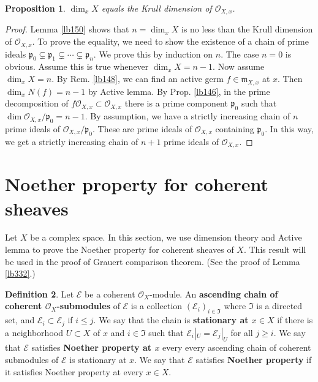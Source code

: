 \documentclass[12pt,b5paper,notitlepage]{report}
\theoremstyle{definition}
\newtheorem{df}{Definition}[section]
\theoremstyle{plain}
\newtheorem{pp}[df]{Proposition}
\newcommand{\fk}{\mathfrak}
\newcommand{\scr}{\mathscr}
\newcommand{\pk}{\mathfrak p}
\numberwithin{equation}{section}
\begin{document}
\begin{pp}\label{lb392}
$\dim_xX$ equals the Krull dimension of $\scr O_{X,x}$.  
\end{pp}


\begin{proof}
Lemma \ref{lb150} shows that $n=\dim_xX$ is no less than the Krull dimension of $\scr O_{X,x}$. To prove the equality, we need to show the existence of a chain of prime ideals $\pk_0\subsetneq\pk_1\subsetneq\cdots\subsetneq \pk_n$. We prove this by induction on $n$. The case $n=0$ is obvious. Assume this is true whenever $\dim_xX=n-1$. Now assume $\dim_xX=n$. By Rem. \ref{lb148}, we can find an active germ $f\in\fk m_{X,x}$ at $x$. Then $\dim_x N(f)=n-1$ by Active lemma. By Prop. \ref{lb146}, in the prime decomposition of $f\scr O_{X,x}\subset\scr O_{X,x}$ there is a prime component $\pk_0$ such that $\dim\scr O_{X,x}/\pk_0=n-1$. By assumption, we have a strictly increasing chain of $n$ prime ideals of  $\scr O_{X,x}/\pk_0$. These are prime ideals of $\scr O_{X,x}$ containing $\pk_0$. In this way, we get a strictly increasing chain of $n+1$ prime ideals of $\scr O_{X,x}$.
\end{proof}



\section{Noether property for coherent sheaves}

Let $X$ be a complex space. In this section, we use dimension theory and Active lemma to prove the Noether property for coherent sheaves of $X$. This result will be used in the proof of Grauert comparison theorem. (See the proof of Lemma \ref{lb332}.)

\begin{df}
Let $\scr E$ be a coherent $\scr O_X$-module. An \textbf{ascending chain of coherent $\scr O_X$-submodules} of $\scr E$ is a collection $(\scr E_i)_{i\in\fk I}$ where $\fk I$ is a directed set, and $\scr E_i\subset\scr E_j$ if $i\leq j$. We say that the chain is \textbf{stationary at $x\in X$} if there is a neighborhood $U\subset X$ of $x$ and $i\in\fk I$ such that $\scr E_i|_U=\scr E_j|_U$ for all $j\geq i$. We say that $\scr E$ satisfies \textbf{Noether property at $x$}  every every ascending chain of coherent submodules of $\scr E$ is stationary at $x$. We say that $\scr E$ satisfies \textbf{Noether property} if it satisfies Noether property at every $x\in X$.
\end{df}
\end{document}
